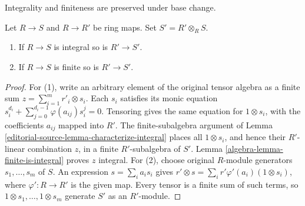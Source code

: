 \begin{lemma}
\label{editorial-source-lemma-base-change-integral}
\begin{slogan}
Integrality and finiteness are preserved under base change.
\end{slogan}
Let $R \to S$ and $R \to R'$ be ring maps.
Set $S' = R' \otimes_R S$.
\begin{enumerate}
\item If $R \to S$ is integral so is $R' \to S'$.
\item If $R \to S$ is finite so is $R' \to S'$.
\end{enumerate}
\end{lemma}

\begin{proof}
For (1), write an arbitrary element of the original tensor algebra
as a finite sum $z=\sum_{i=1}^m r'_i\otimes s_i$.
Each $s_i$ satisfies its monic equation
$s_i^{d_i}+\sum_{j=0}^{d_i-1}\varphi(a_{ij})s_i^j=0$.
Tensoring gives the same equation for $1\otimes s_i$, with the
coefficients $a_{ij}$ mapped into $R'$. The finite-subalgebra
argument of Lemma \ref{editorial-source-lemma-characterize-integral} places all
$1\otimes s_i$, and hence their $R'$-linear combination $z$,
in a finite $R'$-subalgebra of $S'$. Lemma
\ref{algebra-lemma-finite-is-integral} proves $z$ integral.
For (2), choose original $R$-module generators $s_1,\ldots,s_m$
of $S$. An expression $s=\sum_i a_i s_i$ gives
$r'\otimes s=\sum_i r'\varphi'(a_i)(1\otimes s_i)$, where
$\varphi':R\to R'$ is the given map. Every tensor is a finite
sum of such terms, so $1\otimes s_1,\ldots,1\otimes s_m$
generate $S'$ as an $R'$-module.
\end{proof}